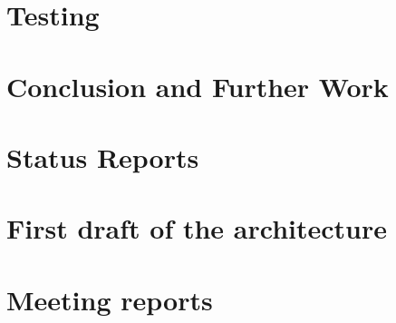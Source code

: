 \documentclass[11pt,a4paper,twoside]{report}
\begin{document}
\cleardoublepage
\chapter{Testing}\label{ch:systest}


\cleardoublepage
\chapter{Conclusion and Further Work}\label{ch:conclusion}




\printglossary

\appendix
\appendixpage
\addappheadtotoc

\cleardoublepage
\chapter{Status Reports}\label{app:statusreports}


\cleardoublepage
\chapter{First draft of the architecture}\label{app:firstdraftarchi}


\cleardoublepage
\chapter{Meeting reports}\label{app:meetings}

\end{document}
